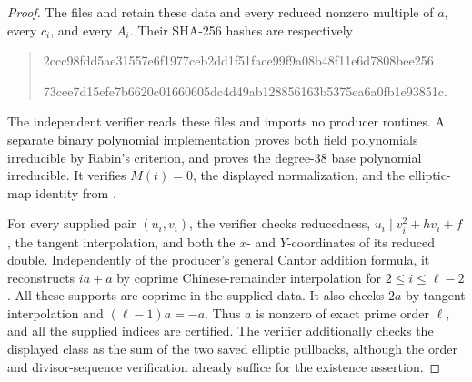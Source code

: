 \begin{proof}
The files  and
 retain these data and
every reduced nonzero multiple of $a$, every $c_i$, and every $A_i$.
Their SHA-256 hashes are respectively
\begin{quote}\small\ttfamily
2ccc98fdd5ae31557e6f1977ceb2dd1f51face99f9a08b48f11e6d7808bee256
\par
73cee7d15efe7b6620c01660605dc4d49ab128856163b5375ea6a0fb1e93851c.
\end{quote}
The independent verifier  reads
these files and imports no producer routines. A separate binary
polynomial implementation proves both field polynomials irreducible
by Rabin's criterion, and proves the degree-38 base polynomial
irreducible. It verifies $M(t)=0$, the displayed normalization, and
the elliptic-map identity from .

For every supplied pair $(u_i,v_i)$, the verifier checks reducedness,
$u_i\mid v_i^2+hv_i+f$, the tangent interpolation, and both the
$x$- and $Y$-coordinates of its reduced double. Independently of
the producer's general Cantor addition formula, it reconstructs
$ia+a$ by coprime Chinese-remainder interpolation for
$2\le i\le\ell-2$. All these supports are coprime in the supplied
data. It also checks $2a$ by tangent interpolation and
$(\ell-1)a=-a$. Thus $a$ is nonzero of exact prime order $\ell$,
and all the supplied indices are certified. The verifier additionally
checks the displayed class as the sum of the two saved elliptic
pullbacks, although the order and divisor-sequence verification
already suffice for the existence assertion.


\end{proof}
